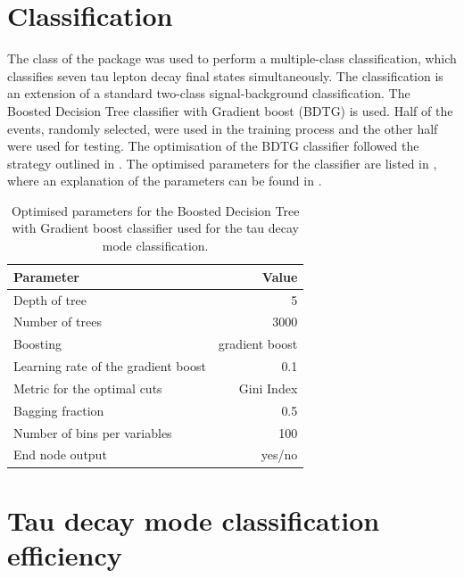 \section{Classification}
\label{sec:tauMVA}

The \multiclass class of the \TMVA package \cite{Therhaag:2009dp} was used to perform a multiple-class classification, which classifies seven tau lepton decay final states simultaneously. The \multiclass classification is an extension of a standard two-class signal-background classification. The Boosted Decision Tree classifier with Gradient boost (BDTG) is used. Half of the events, randomly selected, were used in the training process and the other half were used for testing. The optimisation of the BDTG classifier followed the strategy outlined in . The optimised parameters for the classifier are listed in , where an explanation of the parameters can be found in .




\begin{table}[!htbp]\centering
\begin{tabular}{lr}
\hline \hline
 Parameter &  Value \\
\hline
Depth of tree & 5 \\
Number of trees & 3000 \\
Boosting & gradient boost \\
Learning rate of the gradient boost & 0.1 \\
Metric for the optimal cuts & Gini Index \\
Bagging fraction & 0.5 \\
Number of bins per variables & 100 \\
End node output & yes/no \\
\hline \hline
\end{tabular}
\caption
{Optimised parameters for the Boosted Decision Tree with Gradient boost \multiclass classifier used for the tau decay mode classification.}
\label{tab:tauBDTparameters}
\end{table}


\section{Tau decay mode classification efficiency}
\label{sec:tauClassificationEff}

